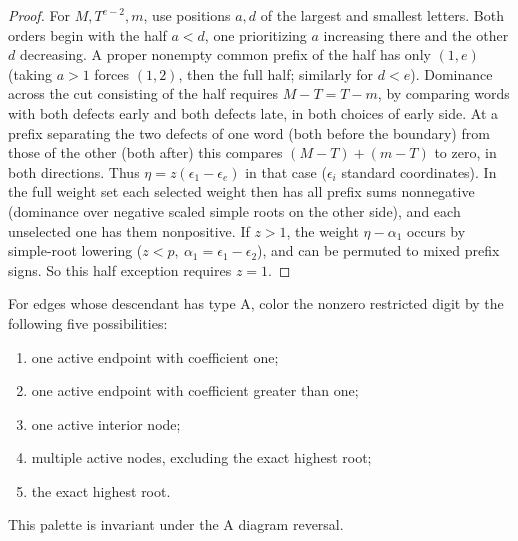 \begin{proof}
For \(M,T^{e-2},m\), use positions \(a,d\) of the largest and smallest letters. Both orders begin with the half \(a<d\), one prioritizing \(a\) increasing there and the other \(d\) decreasing. A proper nonempty common prefix of the half has only \((1,e)\) (taking \(a>1\) forces \((1,2)\), then the full half; similarly for \(d<e\)). Dominance across the cut consisting of the half requires \(M-T=T-m\), by comparing words with both defects early and both defects late, in both choices of early side. At a prefix separating the two defects of one word (both before the boundary) from those of the other (both after) this compares \((M-T)+(m-T)\) to zero, in both directions. Thus \(\eta=z(\epsilon_1-\epsilon_e)\) in that case (\(\epsilon_i\) standard coordinates). In the full weight set each selected weight then has all prefix sums nonnegative (dominance over negative scaled simple roots on the other side), and each unselected one has them nonpositive. If \(z>1\), the weight \(\eta-\alpha_1\) occurs by simple-root lowering (\(z<p,\ \alpha_1=\epsilon_1-\epsilon_2\)), and can be permuted to mixed prefix signs. So this half exception requires \(z=1\).
\end{proof}

For edges whose descendant has type A, color the nonzero restricted digit by the following five possibilities:
\begin{enumerate}
\item one active endpoint with coefficient one;
\item one active endpoint with coefficient greater than one;
\item one active interior node;
\item multiple active nodes, excluding the exact highest root;
\item the exact highest root.
\end{enumerate}
This palette is invariant under the A diagram reversal.

